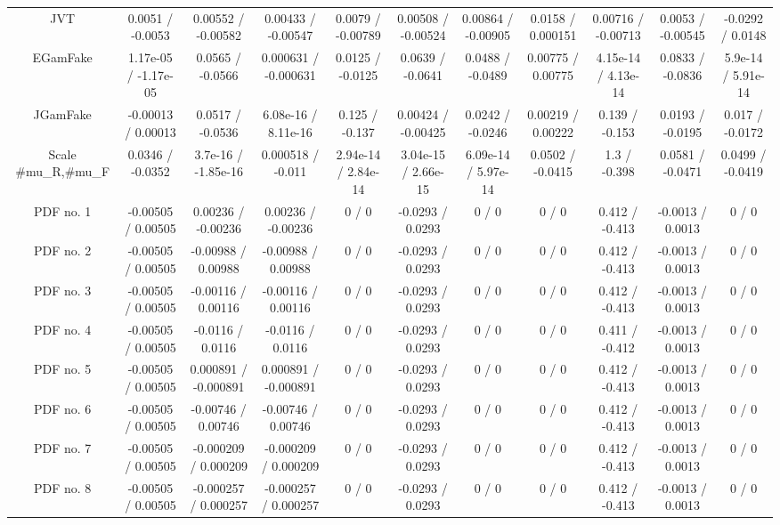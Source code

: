 \begin{table}[htbp]
\begin{center}
\begin{tabular}{|c|c|c|c|c|c|c|c|c|c|c|}
  JVT & 0.0051 / -0.0053 & 0.00552 / -0.00582 & 0.00433 / -0.00547 & 0.0079 / -0.00789 & 0.00508 / -0.00524 & 0.00864 / -0.00905 & 0.0158 / 0.000151 & 0.00716 / -0.00713 & 0.0053 / -0.00545 & -0.0292 / 0.0148 \\ 
  EGamFake & 1.17e-05 / -1.17e-05 & 0.0565 / -0.0566 & 0.000631 / -0.000631 & 0.0125 / -0.0125 & 0.0639 / -0.0641 & 0.0488 / -0.0489 & 0.00775 / 0.00775 & 4.15e-14 / 4.13e-14 & 0.0833 / -0.0836 & 5.9e-14 / 5.91e-14 \\ 
  JGamFake & -0.00013 / 0.00013 & 0.0517 / -0.0536 & 6.08e-16 / 8.11e-16 & 0.125 / -0.137 & 0.00424 / -0.00425 & 0.0242 / -0.0246 & 0.00219 / 0.00222 & 0.139 / -0.153 & 0.0193 / -0.0195 & 0.017 / -0.0172 \\ 
  Scale #mu_{R},#mu_{F} & 0.0346 / -0.0352 & 3.7e-16 / -1.85e-16 & 0.000518 / -0.011 & 2.94e-14 / 2.84e-14 & 3.04e-15 / 2.66e-15 & 6.09e-14 / 5.97e-14 & 0.0502 / -0.0415 & 1.3 / -0.398 & 0.0581 / -0.0471 & 0.0499 / -0.0419 \\ 
  PDF no. 1 & -0.00505 / 0.00505 & 0.00236 / -0.00236 & 0.00236 / -0.00236 & 0 / 0 & -0.0293 / 0.0293 & 0 / 0 & 0 / 0 & 0.412 / -0.413 & -0.0013 / 0.0013 & 0 / 0 \\ 
  PDF no. 2 & -0.00505 / 0.00505 & -0.00988 / 0.00988 & -0.00988 / 0.00988 & 0 / 0 & -0.0293 / 0.0293 & 0 / 0 & 0 / 0 & 0.412 / -0.413 & -0.0013 / 0.0013 & 0 / 0 \\ 
  PDF no. 3 & -0.00505 / 0.00505 & -0.00116 / 0.00116 & -0.00116 / 0.00116 & 0 / 0 & -0.0293 / 0.0293 & 0 / 0 & 0 / 0 & 0.412 / -0.413 & -0.0013 / 0.0013 & 0 / 0 \\ 
  PDF no. 4 & -0.00505 / 0.00505 & -0.0116 / 0.0116 & -0.0116 / 0.0116 & 0 / 0 & -0.0293 / 0.0293 & 0 / 0 & 0 / 0 & 0.411 / -0.412 & -0.0013 / 0.0013 & 0 / 0 \\ 
  PDF no. 5 & -0.00505 / 0.00505 & 0.000891 / -0.000891 & 0.000891 / -0.000891 & 0 / 0 & -0.0293 / 0.0293 & 0 / 0 & 0 / 0 & 0.412 / -0.413 & -0.0013 / 0.0013 & 0 / 0 \\ 
  PDF no. 6 & -0.00505 / 0.00505 & -0.00746 / 0.00746 & -0.00746 / 0.00746 & 0 / 0 & -0.0293 / 0.0293 & 0 / 0 & 0 / 0 & 0.412 / -0.413 & -0.0013 / 0.0013 & 0 / 0 \\ 
  PDF no. 7 & -0.00505 / 0.00505 & -0.000209 / 0.000209 & -0.000209 / 0.000209 & 0 / 0 & -0.0293 / 0.0293 & 0 / 0 & 0 / 0 & 0.412 / -0.413 & -0.0013 / 0.0013 & 0 / 0 \\ 
  PDF no. 8 & -0.00505 / 0.00505 & -0.000257 / 0.000257 & -0.000257 / 0.000257 & 0 / 0 & -0.0293 / 0.0293 & 0 / 0 & 0 / 0 & 0.412 / -0.413 & -0.0013 / 0.0013 & 0 / 0 \\ 

\end{tabular}
\end{center}
\end{table}
